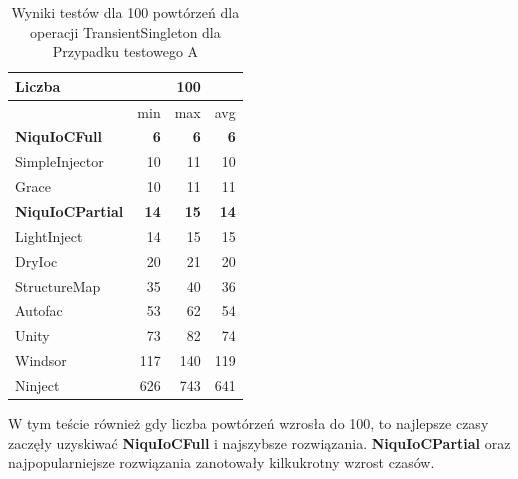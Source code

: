 \documentclass[12pt]{article}
\begin{document}
\begin{table}[H]
\captionsetup{belowskip=0pt,aboveskip=0pt}
\begin{center}
\begin{small}
	\begin{tabular}{ | l | r r r | }
    		\hline
Liczba & & 100 & \\ \hline
 & min & max & avg \\ \hline
\textbf{NiquIoCFull} & \textbf{6} & \textbf{6} & \textbf{6} \\ \hline
SimpleInjector & 10 & 11 & 10 \\ \hline
Grace & 10 & 11 & 11 \\ \hline
\textbf{NiquIoCPartial} & \textbf{14} & \textbf{15} & \textbf{14} \\ \hline
LightInject & 14 & 15 & 15 \\ \hline
DryIoc & 20 & 21 & 20 \\ \hline
StructureMap & 35 & 40 & 36 \\ \hline
Autofac & 53 & 62 & 54 \\ \hline
Unity & 73 & 82 & 74 \\ \hline
Windsor & 117 & 140 & 119 \\ \hline
Ninject & 626 & 743 & 641 \\ \hline
  	\end{tabular}
\end{small}
\end{center}
\caption{Wyniki testów dla 100 powtórzeń dla operacji TransientSingleton dla Przypadku testowego A}
\label{TestCaseA_TransientSingleton100}
\end{table}
W tym teście również gdy liczba powtórzeń wzrosła do 100, to najlepsze czasy zaczęły uzyskiwać \textbf{NiquIoCFull} i najszybsze rozwiązania. \textbf{NiquIoCPartial} oraz najpopularniejsze rozwiązania zanotowały kilkukrotny wzrost czasów.
\\ \\
\end{document}
